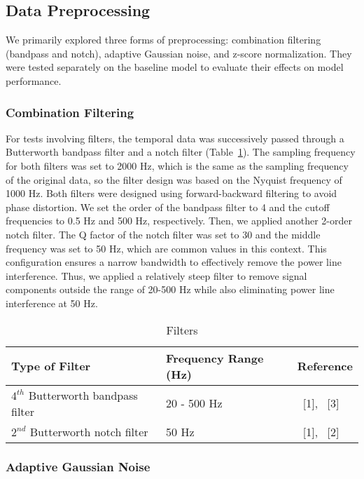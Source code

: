 \subsection{Data Preprocessing}

We primarily explored three forms of preprocessing: combination filtering (bandpass and notch), 
adaptive Gaussian noise, and z-score normalization.
They were tested separately on the baseline model to evaluate their effects on model performance.

\subsubsection{Combination Filtering}

For tests involving filters, the temporal data was successively passed through a Butterworth bandpass filter and a notch filter (Table~\ref{filters}).
The sampling frequency for both filters was set to 2000 Hz, which is the same as the sampling frequency of the original data,
so the filter design was based on the Nyquist frequency of 1000 Hz.
Both filters were designed using forward-backward filtering to avoid phase distortion.
We set the order of the bandpass filter to 4 and the cutoff frequencies to 0.5 Hz and 500 Hz, respectively.
Then, we applied another 2-order notch filter.
The Q factor of the notch filter was set to 30 and the middle frequency was set to 50 Hz, 
which are common values in this context. This configuration ensures a narrow bandwidth to effectively remove the power line interference.
Thus, we applied a relatively steep filter to remove signal components outside the range of 20-500 Hz 
while also eliminating power line interference at 50 Hz.

\begin{table}
    \caption{Filters}
    \label{filters}
    \centering
    \begin{tabular}{lll}
      \toprule
      \cmidrule(r){1-2}
      Type of Filter     & Frequency Range (Hz)     & Reference \\
      \midrule
      $4^{th}$ Butterworth bandpass filter & 20 - 500 Hz  &  ~[1], ~[3]    \\
      $2^{nd}$ Butterworth notch filter    & 50 Hz        &  ~[1], ~[2]    \\
      \bottomrule
    \end{tabular}
  \end{table}
  
\subsubsection{Adaptive Gaussian Noise}

